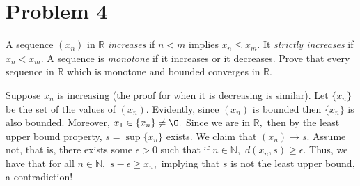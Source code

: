 \documentclass[11pt]{article}
\newcommand{\bbN}{\mathbb{N}}
\newcommand{\bbR}{\mathbb{R}}
\renewcommand{\emptyset}{\O}
\begin{document}
\newpage
\section*{Problem 4}
\begin{problem}
A sequence $(x_n)$ in $\bbR$ \textit{increases} if $n<m$ implies $x_n \leq x_m.$ It \textit{strictly increases} if $x_n < x_m.$ A sequence is \textit{monotone} if it increases or it decreases. Prove that every sequence in $\bbR$ which is monotone and bounded converges in $\bbR$.
\end{problem}
\begin{solution}
    Suppose $x_n$ is increasing (the proof for when it is decreasing is similar).
    Let $\{x_n\}$ be the set of the values of $(x_n).$ Evidently, since $(x_n)$ is bounded then $\{x_n\}$ is also bounded. Moreover, $x_1 \in \{x_n\}\neq \emptyset.$ Since we are in $\bbR,$ then by the least upper bound property, $s = \sup\{x_n\}$ exists. We claim that $(x_n) \to s.$ Assume not, that is, there exists some $\epsilon>0$ such that if $n\in \bbN,$ $d(x_n, s)\geq \epsilon.$ Thus, we have that for all $n\in \bbN,$ $s - \epsilon \geq x_n,$ implying that $s$ is not the least upper bound, a contradiction!
\end{solution}

\newpage
\end{document}
